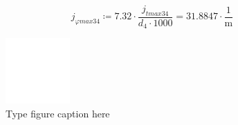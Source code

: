 \documentclass{article}
\newcommand{\defeq}{\coloneq} %
\begin{document}
\begin{equation*}
\textit{j}_{\textit{φmax34}} \defeq 7.32 \cdot \frac{\textit{j}_{\textit{tmax34}}}{\textit{d}_{\textit{4}} \cdot 1000} = {31.8847 \cdot \frac{1}{\mathrm{m}}}
\end{equation*}
\begin{figure}[h!]
 \begin{center}
  \includegraphics[max width=\textwidth]{calculations/883.png}
  \caption{Type figure caption here}
  \label{fig:883}
 \end{center}
\end{figure}
\end{document}
